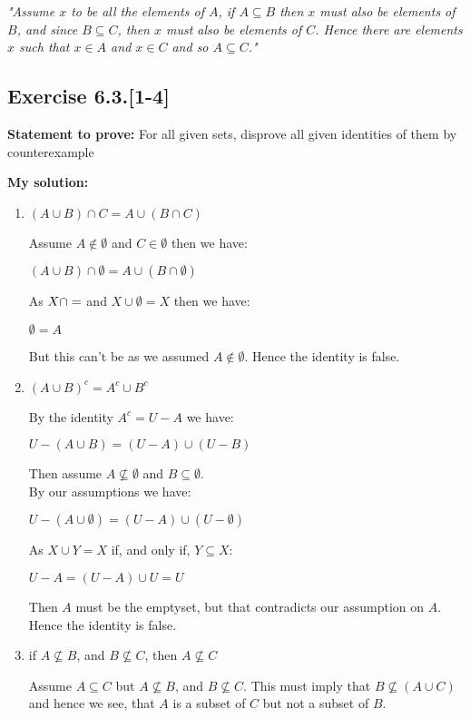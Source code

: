 \documentclass{article}
\newcommand{\cent}[1]{\begin{center}#1\end{center}}
\newcommand{\In}{\! \in \!}
\newcommand{\Prove}{\textbf{Statement to prove: }}
\newcommand{\Solution}{\textbf{My solution: }}
\newcommand{\Exercise}[1]{\subsection{Exercise #1}}
\begin{document}
	\begin{center}
		\textit{"Assume $ x $ to be all the elements of $ A $, if $ A \subseteq B$ then $x$ must also be elements of $B$, and since $B \subseteq C$, then $x$ must also be elements of $C$. Hence there are elements $x$ such that $ x \In A $ and $ x \In C $ and so $ A \subseteq C $."}
	\end{center}

	\Exercise{6.3.[1-4]}
	
	\Prove
	For all given sets, disprove all given identities of them by counterexample
	
	\Solution
	\begin{enumerate}
		\item $ (A \cup B) \cap C = A \cup (B \cap C) $
		
		Assume $A \notin \emptyset$ and $C \In \emptyset$ then we have:
		
		\cent{$ (A \cup B) \cap \emptyset = A \cup (B \cap \emptyset) $}
		
		As $X \cap \empty = \empty$ and $X \cup \emptyset = X$ then we have:
		
		\cent{$ \emptyset = A $}
		
		But this can't be as we assumed $A \notin \emptyset$. Hence the identity is false.
		
		\item $(A \cup B)^c = A^c \cup B^c$
		
		By the identity $ A^c = U-A $ we have:
		
		\cent{$U - (A \cup B) = (U-A) \cup (U-B)$}
		
		Then assume $A \not \subseteq \emptyset$ and $B \subseteq \emptyset$.\\
		
		By our assumptions we have:
		
		\cent{$ U - (A \cup \emptyset) = (U-A) \cup (U-\emptyset) $}
		
		As $X \cup Y = X$ if, and only if, $Y \subseteq X$:
		
		\cent{$ U - A = (U-A) \cup U = U $}
		
		Then $A$ must be the emptyset, but that contradicts our assumption on $A$. Hence the identity is false.
		
		\item if $ A \not \subseteq B $, and $ B \not \subseteq C $, then $ A \not \subseteq C $
		
		Assume $A \subseteq C$ but $A \not \subseteq B$, and $B \not \subseteq C$. This must imply that $B \not \subseteq (A \cup C)$ and hence we see, that $A$ is a subset of $C$ but not a subset of $B$.
		

\end{enumerate}
\end{document}
